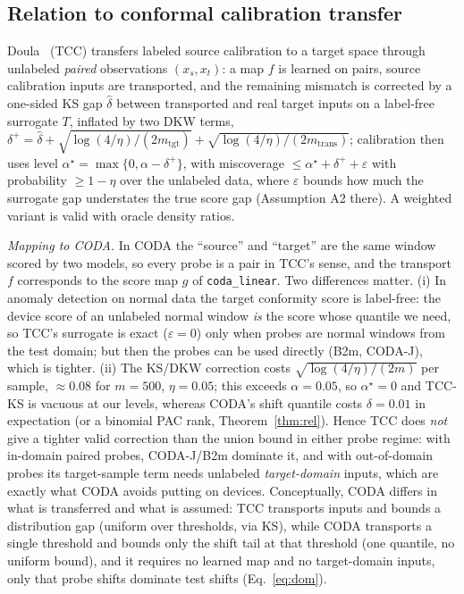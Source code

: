 \documentclass[conference]{IEEEtran}
\theoremstyle{definition}
\theoremstyle{remark}
\begin{document}
\subsection{Relation to conformal calibration transfer}
Doula~\cite{doula2026} (TCC) transfers labeled source calibration to a target space through unlabeled \emph{paired} observations $(x_s,x_t)$: a map $f$ is learned on pairs, source calibration inputs are transported, and the remaining mismatch is corrected by a one-sided KS gap $\hat\delta$ between transported and real target inputs on a label-free surrogate $T$, inflated by two DKW terms, $\delta^+=\hat\delta+\sqrt{\log(4/\eta)/(2m_{\mathrm{tgt}})}+\sqrt{\log(4/\eta)/(2m_{\mathrm{trans}})}$; calibration then uses level $\alpha^\star=\max\{0,\alpha-\delta^+\}$, with miscoverage $\le\alpha^\star+\delta^++\varepsilon$ with probability $\ge1-\eta$ over the unlabeled data, where $\varepsilon$ bounds how much the surrogate gap understates the true score gap (Assumption A2 there). A weighted variant is valid with oracle density ratios.

\emph{Mapping to CODA.} In CODA the ``source'' and ``target'' are the same window scored by two models, so every probe is a pair in TCC's sense, and the transport $f$ corresponds to the score map $g$ of \texttt{coda\_linear}. Two differences matter. (i) In anomaly detection on normal data the target conformity score is label-free: the device score of an unlabeled normal window \emph{is} the score whose quantile we need, so TCC's surrogate is exact ($\varepsilon=0$) only when probes are normal windows from the test domain; but then the probes can be used directly (B2m, CODA-J), which is tighter. (ii) The KS/DKW correction costs $\sqrt{\log(4/\eta)/(2m)}$ per sample, $\approx0.08$ for $m=500$, $\eta=0.05$; this exceeds $\alpha=0.05$, so $\alpha^\star=0$ and TCC-KS is vacuous at our levels, whereas CODA's shift quantile costs $\delta=0.01$ in expectation (or a binomial PAC rank, Theorem~\ref{thm:rel}). Hence TCC does \emph{not} give a tighter valid correction than the union bound in either probe regime: with in-domain paired probes, CODA-J/B2m dominate it, and with out-of-domain probes its target-sample term needs unlabeled \emph{target-domain} inputs, which are exactly what CODA avoids putting on devices. Conceptually, CODA differs in what is transferred and what is assumed: TCC transports inputs and bounds a distribution gap (uniform over thresholds, via KS), while CODA transports a single threshold and bounds only the shift tail at that threshold (one quantile, no uniform bound), and it requires no learned map and no target-domain inputs, only that probe shifts dominate test shifts (Eq.~\eqref{eq:dom}).
\end{document}
